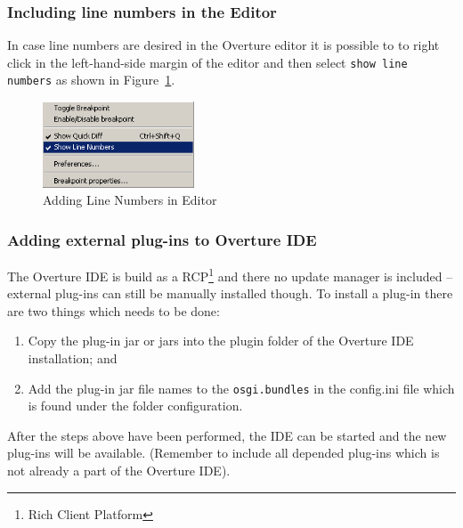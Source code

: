 \documentclass{overturerep}
\begin{document}
{\subsubsection{Including line numbers in the Editor}

In case line numbers are desired in the Overture
editor it is possible to to right click in the left-hand-side margin
of the editor and then select \texttt{show line numbers} as shown in
Figure~\ref{fig:linenumbers}. 

\begin{figure}[!htb]
\begin{center}
\includegraphics[width=0.4\textwidth]{screenDumps/linenumbers}
\caption{Adding Line Numbers in Editor\label{fig:linenumbers}}
\end{center}
\end{figure}

\subsubsection{Adding external plug-ins to Overture IDE}

The Overture IDE is build as a RCP\footnote{Rich Client Platform} and
there no update manager is included -- external plug-ins can
still be manually installed though. To install a plug-in there are two
things which needs to be done:
\begin{enumerate}
\item Copy the plug-in jar or jars into the plugin folder of the Overture IDE installation; and
\item Add the plug-in jar file names to the \texttt{osgi.bundles} in the config.ini file which is found under the folder configuration.
\end{enumerate}

After the steps above have been performed, the IDE can be started and the new plug-ins will be available. (Remember to include all depended plug-ins which is not already a part of the Overture IDE).

}
\end{document}
